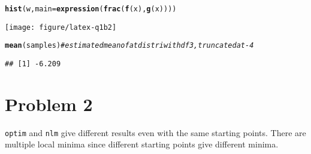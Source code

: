 \documentclass{article}\usepackage[]{graphicx}\usepackage[]{color}
\makeatletter
\def\maxwidth{ %
  \ifdim\Gin@nat@width>\linewidth
    \linewidth
  \else
    \Gin@nat@width
  \fi
}
\newcommand{\hlcom}[1]{\textcolor[rgb]{0.678,0.584,0.686}{\textit{#1}}}%
\newcommand{\hlstd}[1]{\textcolor[rgb]{0.345,0.345,0.345}{#1}}%
\newcommand{\hlkwc}[1]{\textcolor[rgb]{0.333,0.667,0.333}{#1}}%
\newcommand{\hlkwd}[1]{\textcolor[rgb]{0.737,0.353,0.396}{\textbf{#1}}}%
\newenvironment{kframe}{%
 \def\at@end@of@kframe{}%
 \ifinner\ifhmode%
  \def\at@end@of@kframe{\end{minipage}}%
  \begin{minipage}{\columnwidth}%
 \fi\fi%
 \def\FrameCommand##1{\hskip\@totalleftmargin \hskip-\fboxsep
 \colorbox{shadecolor}{##1}\hskip-\fboxsep
     \hskip-\linewidth \hskip-\@totalleftmargin \hskip\columnwidth}%
 \MakeFramed {\advance\hsize-\width
   \@totalleftmargin\z@ \linewidth\hsize
   \@setminipage}}%
 {\par\unskip\endMakeFramed%
 \at@end@of@kframe}
\newenvironment{knitrout}{}{} %
\makeatother
\begin{document}
\begin{knitrout}
\begin{kframe}
\begin{verbatim}
\end{verbatim}
\begin{alltt}
\hlkwd{hist}\hlstd{(w,} \hlkwc{main} \hlstd{=} \hlkwd{expression}\hlstd{(}\hlkwd{frac}\hlstd{(}\hlkwd{f}\hlstd{(x),}\hlkwd{g}\hlstd{(x))))}
\end{alltt}
\end{kframe}
\texttt{[image: figure/latex-q1b2]} 
\begin{kframe}\begin{alltt}
\hlkwd{mean}\hlstd{(samples)} \hlcom{# estimated mean of a t distri with df 3, truncated at -4}
\end{alltt}
\begin{verbatim}
## [1] -6.209
\end{verbatim}
\end{kframe}
\end{knitrout}
\section{Problem 2}
\texttt{optim} and \texttt{nlm} give different results even with the same starting points. There are multiple local minima since different starting points give different minima.
\end{document}
